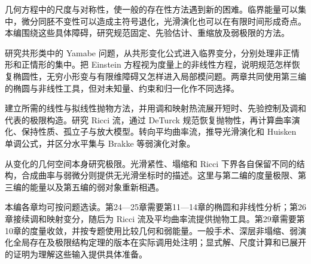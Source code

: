 
% 

\BookPartGuide
几何方程中的尺度与对称性，使一般的存在性方法遇到新的困难。临界能量可以集中，微分同胚不变性可以造成主符号退化，光滑演化也可以在有限时间形成奇点。本编围绕这些具体障碍，研究规范固定、先验估计、重缩放及弱极限的方法。

\ProseParagraphBreak
{}研究共形类中的 Yamabe 问题，从共形变化公式进入临界变分，分别处理非正情形和正情形的集中。把 Einstein 方程视为度量上的非线性方程，说明规范怎样恢复椭圆性，无穷小形变与有限维障碍又怎样进入局部模问题。两章共同使用第三编的椭圆与非线性工具，但对未知量、约束和归一化作不同选择。

\ProseParagraphBreak
{}建立所需的线性与拟线性抛物方法，并用调和映射热流展开短时、先验控制及调和代表的极限构造。研究 Ricci 流，通过 DeTurck 规范恢复抛物性，再计算曲率演化、保持性质、孤立子与放大模型。转向平均曲率流，推导光滑演化和 Huisken 单调公式，并区分水平集与 Brakke 等弱演化对象。

\ProseParagraphBreak
{}从变化的几何空间本身研究极限。光滑紧性、塌缩和 Ricci 下界各自保留不同的结构，合成曲率与弱微分则提供无光滑坐标时的描述。这里与第二编的度量极限、第三编的能量以及第五编的弱对象重新相遇。

\ProseParagraphBreak
本编各章均可按问题选读。第24—25章需要第11—14章的椭圆和非线性分析；第26章接续调和映射变分，随后为 Ricci 流及平均曲率流提供抛物工具。第29章需要第10章的度量收敛，并按专题使用比较几何和弱能量。一般手术、深层非塌缩、弱演化全局存在及极限结构定理的版本在实际调用处注明；显式解、尺度计算和已展开的证明为理解这些输入提供具体准备。







